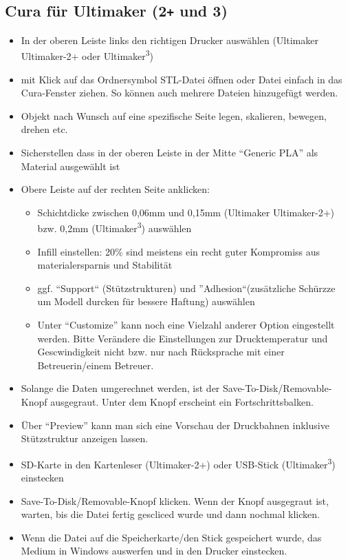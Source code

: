 \documentclass{\basedir/fablab-document}
\newcommand{\ts}[1]{\textsuperscript{#1}}
\begin{document}
\subsection{Cura für Ultimaker (2\texttt{+} und 3)}
\begin{itemize}
\item In der oberen Leiste links den richtigen Drucker auswählen (Ultimaker Ultimaker-2+ oder Ultimaker\ts3)
\item mit Klick auf das Ordnersymbol STL-Datei öffnen oder Datei einfach in das Cura-Fenster ziehen. So können auch mehrere Dateien hinzugefügt werden.
\item Objekt nach Wunsch auf eine spezifische Seite legen, skalieren, bewegen, drehen etc.
\item Sicherstellen dass in der oberen Leiste in der Mitte \enquote{Generic PLA} als Material ausgewählt ist
\item Obere Leiste auf der rechten Seite anklicken:
  \begin{itemize}
    \item Schichtdicke zwischen 0,06mm und 0,15mm (Ultimaker Ultimaker-2+) bzw. 0,2mm (Ultimaker\ts3) auswählen
    \item Infill einstellen: 20\% sind meistens ein recht guter Kompromiss aus materialersparnis und Stabilität
    \item ggf. ``Support`` (Stützstrukturen) und ''Adhesion``(zusätzliche Schürzze um Modell durcken für bessere Haftung) auswählen
    \item Unter \enquote{Customize} kann noch eine Vielzahl anderer Option eingestellt werden. Bitte Verändere die Einstellungen zur Drucktemperatur und Gescwindigkeit nicht bzw. nur nach Rücksprache mit einer Betreuerin/einem Betreuer.
  \end{itemize}
\item Solange die Daten umgerechnet werden, ist der Save-To-Disk/Removable-Knopf ausgegraut. Unter dem Knopf erscheint ein Fortschrittsbalken.
\item Über \enquote{Preview} kann man sich eine Vorschau der Druckbahnen inklusive Stützstruktur anzeigen lassen.
\item SD-Karte in den Kartenleser (Ultimaker-2+) oder USB-Stick (Ultimaker\ts3) einstecken
\item Save-To-Disk/Removable-Knopf klicken. Wenn der Knopf ausgegraut ist, warten, bis die Datei fertig gescliced wurde und dann nochmal klicken.
\item Wenn die Datei auf die Speicherkarte/den Stick gespeichert wurde, das Medium in Windows auswerfen und in den Drucker einstecken.
\end{itemize}
\end{document}

